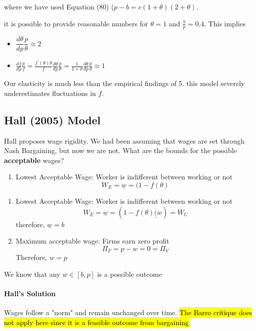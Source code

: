 \documentclass[11pt]{article}
\begin{document}
where we have used Equation (80) ($p-b = c(1+\theta)(2+\theta)$.

it is possible to provide reasonable numbers for $\theta=1$ and $\frac{b}{p}=0.4$. This implies
\begin{itemize}
    \item $\dfrac{d\theta}{dp}\dfrac{p}{\theta}\approx 2$
    \item $\frac{d f}{d p} \frac{p}{f}=\frac{f^{\prime}(\theta) \theta}{f} \frac{d \theta}{d p} \frac{p}{\theta}=\frac{1}{1+\theta} \frac{d \theta}{d p} \frac{p}{\theta} \approx 1$
\end{itemize}

\begin{note}
    Our elasticity is much less than the empirical findings of 5. this model severely underestimates fluctuations in $f$.
\end{note}


\subsection{Hall (2005) Model}

Hall proposes wage rigidity. We had been assuming that wages are set through Nash Bargaining, but now we are not. What are the bounds for the possible \textbf{acceptable} wages?

\begin{enumerate}
    \item Lowest Acceptable Wage: Worker is indifferent between working or not
    \[W_E = \underline{w} = (1-f(\theta)\]
\end{enumerate}

\begin{enumerate}
    \item Lowest Acceptable Wage: Worker is indifferent between working or not
    \[W_E = \underline{w} = (1-f(\theta)\underline(w) = W_U\]
therefore, $\underline{w} = b$


    \item  Maximum acceptable wage: Firms earn zero profit
\[\Pi_F = p - w = 0 = \Pi_V \]
Therefore, $w = p$
\end{enumerate}

We know that any $w \in [b,p]$ is a possible outcome

\paragraph{Hall's Solution}\mbox{}

Wages follow a "norm" and remain unchanged over time. \hl{The Barro critique does not apply here since it is a feasible outcome from bargaining}.
\end{document}

